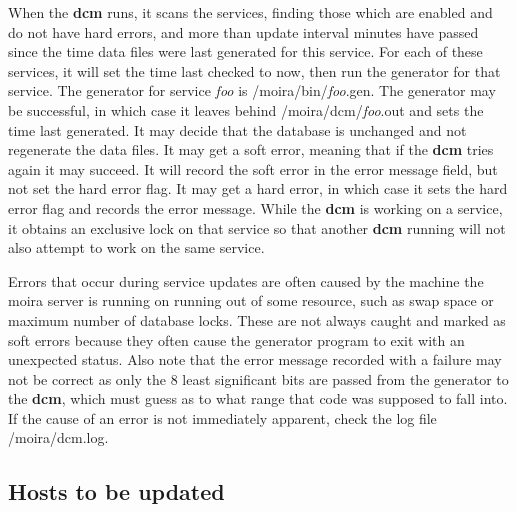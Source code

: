 \documentclass{book}
\begin{document}
When the {\bf dcm} runs, it scans the services, finding those which are
enabled and do not have hard errors, and more than update interval
minutes have passed since the time data files were last generated for
this service.  For each of these services, it will set the time last
checked to now, then run the generator for that service.  The
generator for service {\em foo} is /moira/bin/{\em foo}.gen.  The
generator may be successful, in which case it leaves behind
/moira/dcm/{\em foo}.out and sets the time last generated.  It may
decide that the database is unchanged and not regenerate the
data files.  It may get a soft error, meaning that if the {\bf dcm} tries
again it may succeed.  It will record the soft error in the error
message field, but not set the hard error flag.  It may get a hard
error, in which case it sets the hard error flag and records the error
message.  While the {\bf dcm} is working on a service, it obtains an
exclusive lock on that service so that another {\bf dcm} running will
not also attempt to work on the same service.

Errors that occur during service updates are often caused by the
machine the moira server is running on running out of some resource,
such as swap space or maximum number of database locks.  These are not
always caught and marked as soft errors because they often cause the
generator program to exit with an unexpected status.  Also note that
the error message recorded with a failure may not be correct as only
the 8 least significant bits are passed from the generator to the
{\bf dcm}, which must guess as to what range that code was supposed to
fall into.  If the cause of an error is not immediately apparent,
check the log file /moira/dcm.log.

\subsection{Hosts to be updated}
\end{document}
